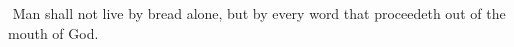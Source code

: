 \documentclass[MAIN]{subfiles}
\begin{document}
$ ${\color{red} Man shall not live by bread alone, but by every word that proceedeth out of the mouth of God.}
\end{document}
